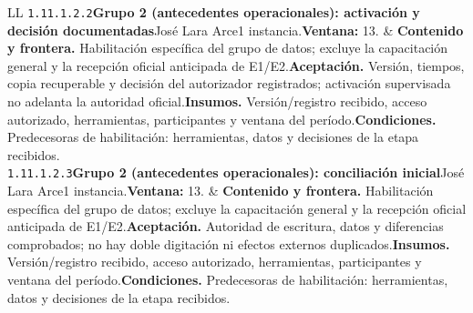 \begin{longtable}{L{\tabcolsep\relax}L{\tabcolsep\relax}}
\texttt{1.\allowbreak{}11.\allowbreak{}1.\allowbreak{}2.\allowbreak{}2}\newline{}\textbf{Grupo 2 (antecedentes operacionales): activación y decisión documentadas}\newline{}José Lara Arce\newline{}1 instancia.\newline{}\textbf{Ventana:} 13. & \textbf{Contenido y frontera.} Habilitación específica del grupo de datos; excluye la capacitación general y la recepción oficial anticipada de E1/E2.\newline{}\textbf{Aceptación.} Versión, tiempos, copia recuperable y decisión del autorizador registrados; activación supervisada no adelanta la autoridad oficial.\newline{}\textbf{Insumos.} Versión/registro recibido, acceso autorizado, herramientas, participantes y ventana del período.\newline{}\textbf{Condiciones.} Predecesoras de habilitación: herramientas, datos y decisiones de la etapa recibidos.\\\hline
\texttt{1.\allowbreak{}11.\allowbreak{}1.\allowbreak{}2.\allowbreak{}3}\newline{}\textbf{Grupo 2 (antecedentes operacionales): conciliación inicial}\newline{}José Lara Arce\newline{}1 instancia.\newline{}\textbf{Ventana:} 13. & \textbf{Contenido y frontera.} Habilitación específica del grupo de datos; excluye la capacitación general y la recepción oficial anticipada de E1/E2.\newline{}\textbf{Aceptación.} Autoridad de escritura, datos y diferencias comprobados; no hay doble digitación ni efectos externos duplicados.\newline{}\textbf{Insumos.} Versión/registro recibido, acceso autorizado, herramientas, participantes y ventana del período.\newline{}\textbf{Condiciones.} Predecesoras de habilitación: herramientas, datos y decisiones de la etapa recibidos.\\\hline

\end{longtable}
